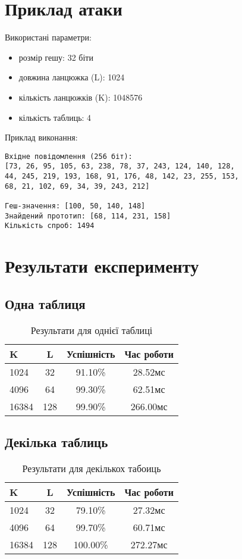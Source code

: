 \documentclass[12pt]{article}
\begin{document}
\section{Приклад атаки}

Використані параметри:
\begin{itemize}
  \item розмір гешу: 32 біти
  \item довжина ланцюжка (L): 1024
  \item кількість ланцюжків (K): 1048576
  \item кількість таблиць: 4
\end{itemize}

Приклад виконання:
\begin{verbatim}
Вхідне повідомлення (256 біт): 
[73, 26, 95, 105, 63, 238, 78, 37, 243, 124, 140, 128, 
44, 245, 219, 193, 168, 91, 176, 48, 142, 23, 255, 153, 
68, 21, 102, 69, 34, 39, 243, 212]

Геш-значення: [100, 50, 140, 148]
Знайдений прототип: [68, 114, 231, 158]
Кількість спроб: 1494
\end{verbatim}

\section{Результати експерименту}

\subsection{Одна таблиця}
\begin{table}[H]
\centering
\begin{tabular}{@{}lccc@{}}
\toprule
K & L & Успішність & Час роботи \\
\midrule 
1024 & 32 & 91.10\% & 28.52мс \\
4096 & 64 & 99.30\% & 62.51мс \\
16384 & 128 & 99.90\% & 266.00мс \\
\bottomrule
\end{tabular}
\caption{Результати для однієї таблиці}
\end{table}

\subsection{Декілька таблиць}
\begin{table}[H]
\centering
\begin{tabular}{@{}lccc@{}}
\toprule
K & L & Успішність & Час роботи \\
\midrule
1024 & 32 & 79.10\% & 27.32мс \\
4096 & 64 & 99.70\% & 60.71мс \\
16384 & 128 & 100.00\% & 272.27мс \\
\bottomrule
\end{tabular}
\caption{Результати для декількох табоиць}
\end{table}
\end{document}
